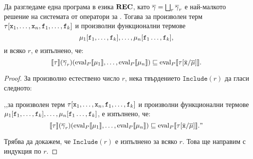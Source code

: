\begin{proposition}
  \label{pr:op-name-inclusion2}
  Да разгледаме една програма  в езика ${\bf REC}$, като
  $\overline{\gamma} = \bigsqcup_r\overline{\gamma}_r$ е най-малкото решение на системата от оператори за .
  Тогава за произволен терм $\tau[\texttt{x}_1,\dots,\texttt{x}_n,\texttt{f}_1,\dots,\texttt{f}_k]$ и
  произволни функционални термове
  \[\mu_1[\texttt{f}_1,\dots,\texttt{f}_k],\dots,\mu_n[\texttt{f}_1\dots,\texttt{f}_k],\]
  и всяко $r$, е изпълнено, че:
  \[\llbracket{\tau}\rrbracket(\overline{\gamma}_r)(\text{eval}_P\llbracket{{\mu_1}}\rrbracket,\dots,\text{eval}_P\llbracket{{\mu_n}}\rrbracket) \sqsubseteq \text{eval}_P\llbracket{{\tau[\bar{\texttt{x}}/\overline{\mu}]}}\rrbracket.\]
\end{proposition}
\begin{proof}
  За произволно естествено число $r$, нека твърдението $\texttt{Include}(r)$ да гласи следното:

  ,,за произволен терм $\tau[\texttt{x}_1,\dots,\texttt{x}_n,\texttt{f}_1,\dots,\texttt{f}_k]$ и
  произволни функционални термове $\mu_1[\texttt{f}_1,\dots,\texttt{f}_k],\dots,\mu_n[\texttt{f}_1\dots,\texttt{f}_k]$,
  е изпълнено, че:
  \[\llbracket{\tau}\rrbracket(\overline{\gamma}_r)(\text{eval}_P\llbracket{{\mu_1}}\rrbracket,\dots,\text{eval}_P\llbracket{{\mu_n}}\rrbracket) \sqsubseteq \text{eval}_P\llbracket{{\tau[\bar{\texttt{x}}/\overline{\mu}]}}\rrbracket.\text{''}\]
  
  Трябва да докажем, че $\texttt{Include}(r)$ е изпълнено за всяко $r$.
  Това ще направим с индукция по $r$.


\end{proof}
